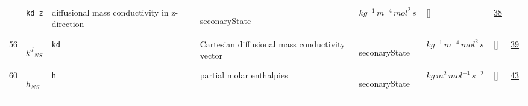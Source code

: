 \begin{longtable}{|p{1cm}|p{3cm}|p{3cm}|p{7cm}|p{3.0cm}|p{3cm}|p{2cm}|p{1cm}|}
             & \verb|kd_z|
             & diffusional mass conductivity in z-direction
             & \begin{lay}seconaryState \end{lay}
             & $ kg^{-1} \,m^{-4} \,mol^{2} \,s \, $
             & []
             & \hyperlink{"e:38"}{ 38 }
                 \\
    56
             & \hypertarget{"v:56"}{ $ {k^{d}}_{{N S}} $}
             & \verb|kd|
             & Cartesian diffusional mass conductivity vector
             & \begin{lay}seconaryState \end{lay}
             & $ kg^{-1} \,m^{-4} \,mol^{2} \,s \, $
             & []
             & \hyperlink{"e:39"}{ 39 }
                 \\
    60
             & \hypertarget{"v:60"}{ $ {h}_{{N S}} $}
             & \verb|h|
             & partial molar enthalpies
             & \begin{lay}seconaryState \end{lay}
             & $ kg \,m^{2} \,mol^{-1} \,s^{-2} \, $
             & []
             & \hyperlink{"e:43"}{ 43 }
                 \\
    \end{longtable}